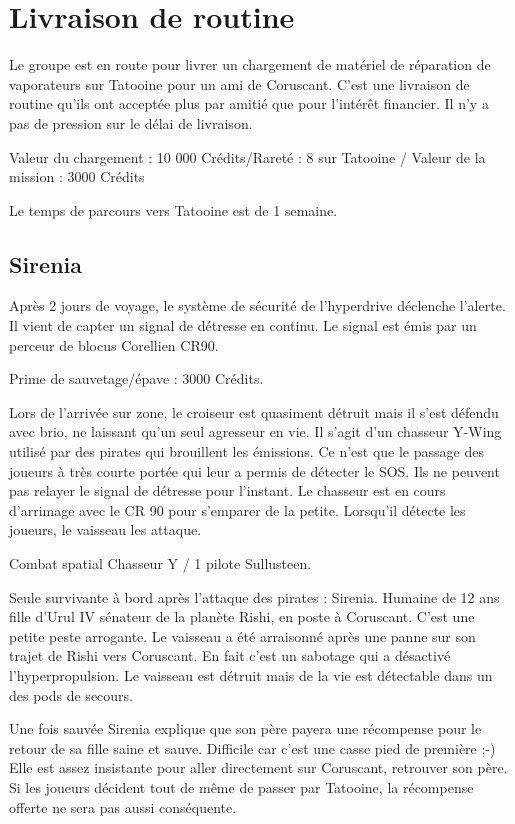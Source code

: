 \documentclass[a4paper,10pt,twoside,twocolumn,openany]{book}
\begin{document}
\chapter{Livraison de routine}

Le groupe est en route pour livrer un chargement de matériel de réparation de vaporateurs sur
Tatooine pour un ami de Coruscant. C’est une livraison de routine qu’ils ont acceptée plus par
amitié que pour l’intérêt financier. Il n’y a pas de pression sur le délai de livraison.

Valeur du chargement : 10 000 Crédits/Rareté : 8 sur Tatooine / Valeur de la mission : 3000
Crédits

Le temps de parcours vers Tatooine est de 1 semaine.

\section{Sirenia}

Après 2 jours de voyage, le système de sécurité de l'hyperdrive déclenche l'alerte. Il vient de
capter un signal de détresse en continu. Le signal est émis par un perceur de blocus Corellien
CR90.

Prime de sauvetage/épave : 3000 Crédits.

Lors de l’arrivée sur zone, le croiseur est quasiment détruit mais il s’est défendu avec brio, ne
laissant qu’un seul agresseur en vie. Il s’agit d’un chasseur Y-Wing utilisé par des pirates qui
brouillent les émissions. Ce n’est que le passage des joueurs à très courte portée qui leur a
permis de détecter le SOS. Ils ne peuvent pas relayer le signal de détresse pour l’instant. Le
chasseur est en cours d’arrimage avec le CR 90 pour s’emparer de la petite. Lorsqu’il détecte
les joueurs, le vaisseau les attaque.

\begin{commentbox}{Combat spatial}
Chasseur Y / 1 pilote Sullusteen.
\end{commentbox}

Seule survivante à bord après l'attaque des pirates : Sirenia. Humaine de 12 ans fille d'Urul IV
sénateur de la planète Rishi, en poste à Coruscant. C'est une petite peste arrogante.
Le vaisseau a été arraisonné après une panne sur son trajet de Rishi vers Coruscant​. ​En fait
c’est un sabotage qui a désactivé l'hyperpropulsion. Le vaisseau est détruit mais de la vie est
détectable dans un des pods de secours.

Une fois sauvée Sirenia explique que son père payera une récompense pour le retour de sa fille
saine et sauve. Difficile car c'est une casse pied de première ;-)
Elle est assez insistante pour aller directement sur Coruscant, retrouver son père. Si les joueurs
décident tout de même de passer par Tatooine, la récompense offerte ne sera pas aussi
conséquente.
\end{document}
